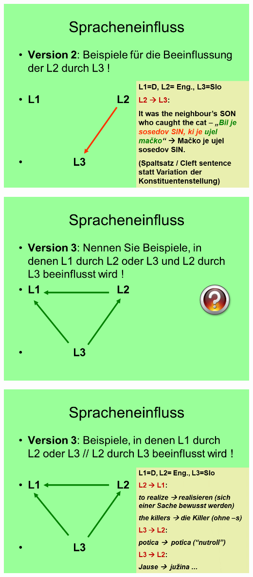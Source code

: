 \documentclass[
  letterpaper,
]{scrbook}
\begin{document}
\includegraphics[width=1\textwidth,height=\textheight]{./pictures/02_Spracheneinfluss_Sprachentrennung/Diapozitiv7.PNG}

\includegraphics[width=1\textwidth,height=\textheight]{./pictures/02_Spracheneinfluss_Sprachentrennung/Diapozitiv8.PNG}

\includegraphics[width=1\textwidth,height=\textheight]{./pictures/02_Spracheneinfluss_Sprachentrennung/Diapozitiv9.PNG}
\end{document}
